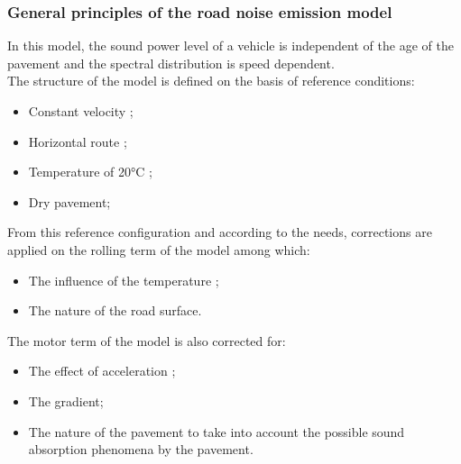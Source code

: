 \documentclass{article}
\begin{document}
\subsubsection{General principles of the road noise emission model}

In this model, the sound power level of a vehicle is independent of the age of the pavement and the spectral distribution is speed dependent. \\
The structure of the model is defined on the basis of reference conditions: 
\begin{itemize}
    \item Constant velocity ;
    \item Horizontal route ;
    \item Temperature of 20°C ;
    \item Dry pavement;
\end{itemize}
    
\noindent From this reference configuration and according to the needs, corrections are applied on the rolling term of the model among which: 

\begin{itemize}
    \item The influence of the temperature ;
    \item The nature of the road surface.
\end{itemize}

\noindent The motor term of the model is also corrected for: 
\begin{itemize}
    \item The effect of acceleration ;
    \item The gradient;
    \item The nature of the pavement to take into account the possible sound absorption phenomena by the pavement.
\end{itemize}
\end{document}
